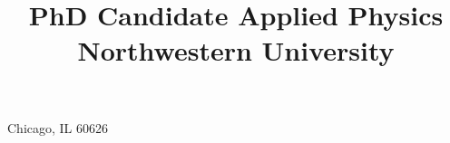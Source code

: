 \usepackage{textcomp}

\usepackage[margin=0.75in]{geometry}


\makeatletter %
\makeatother  %



\setlength{\hintscolumnwidth}{2.2cm}


\title{
	PhD Candidate\texorpdfstring{\newline}{}
    Applied Physics \texorpdfstring{\newline}{}
    Northwestern University
}

\address{1043 W NorthShore Av, Unit 2N}{Chicago, IL 60626}


\usepackage{multibib} %




